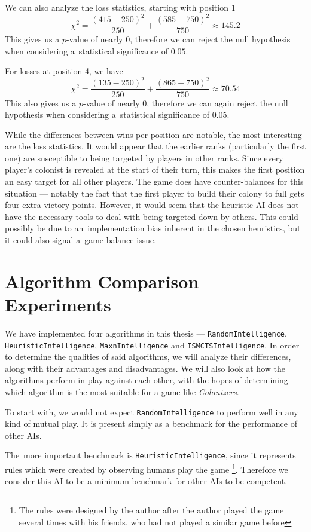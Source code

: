We can also analyze the loss statistics, starting with position 1
$$\chi^{2} = \frac{(415 - 250)^{2}}{250} + \frac{(585 - 750)^{2}}{750} \approx 145.2$$
This gives us a $p$-value of nearly 0, therefore we can reject the null hypothesis
when considering a~statistical significance of $0.05$.

For losses at position 4, we have
$$\chi^{2} = \frac{(135 - 250)^{2}}{250} + \frac{(865 - 750)^{2}}{750} \approx 70.54$$
This also gives us a $p$-value of nearly 0, therefore we can again reject the null hypothesis
when considering a~statistical significance of $0.05$.

While the differences between wins per position are notable, the most interesting
are the loss statistics. It would appear that the earlier ranks (particularly the first one)
are susceptible to being targeted by players in other ranks. Since every player's colonist
is revealed at the start of their turn, this makes the first position an easy target
for all other players. The game does have counter-balances for this situation ---
notably the fact that the first player to build their colony to full gets four extra
victory points. However, it would seem that the heuristic AI does not have the necessary
tools to deal with being targeted down by others. This could possibly be due to
an~implementation bias inherent in the chosen heuristics, but it could also signal
a~game balance issue.

\section{Algorithm Comparison Experiments}

We have implemented four algorithms in this thesis --- \texttt{RandomIntelligence},
\texttt{HeuristicIntelligence}, \texttt{MaxnIntelligence} and \texttt{ISMCTSIntelligence}.
In order to determine the qualities of said algorithms, we will analyze their differences,
along with their advantages and disadvantages. We will also look at how the algorithms
perform in play against each other, with the hopes of determining which algorithm
is the most suitable for a game like \emph{Colonizers}.

To start with, we would not expect \texttt{RandomIntelligence} to perform well in any
kind of mutual play. It is present simply as a benchmark for the performance of
other AIs.

The~more important benchmark is \texttt{HeuristicIntelligence}, since it represents
rules which were created by observing humans play the game
\footnote{The rules were designed by the author after the author played the game
several times with his friends, who had not played a similar game before}.
Therefore we consider this
AI to be a minimum benchmark for other AIs to be competent.

